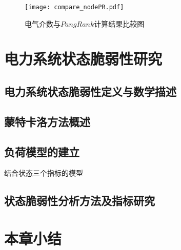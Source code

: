 \begin{figure}[H] %
  \centering
  \texttt{[image: compare\_nodePR.pdf]}
  \caption{电气介数与$PangRank$计算结果比较图}
  \label{fig:compare_nodePR}
\end{figure}

\section{电力系统状态脆弱性研究}
\label{sec:status}



\subsection{电力系统状态脆弱性定义与数学描述}
\label{sec:vulneStaus}



\subsection{蒙特卡洛方法概述}
\label{sec:vulneStaus}






\subsection{负荷模型的建立}
\label{sec:vulneStaus}
结合状态三个指标的模型




\subsection{状态脆弱性分析方法及指标研究}
\label{sec:static}







\section{本章小结}
\label{sec:sum3}





